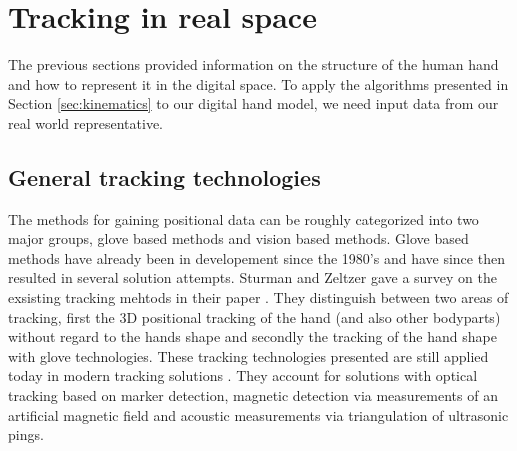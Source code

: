 \chapter{Tracking in real space}
The previous sections provided information on the structure of the human hand and how to represent it in the digital space. To apply the algorithms presented in Section \ref{sec:kinematics} to our digital hand model, we need input data from our real world representative.
\section{General tracking technologies}
\label{General tracking technologies}
The methods for gaining positional data can be roughly categorized into two major groups, glove based methods and vision based methods. Glove based methods have already been in developement since the 1980's \cite{Bolt.1980} and have since then resulted in several solution attempts. Sturman and Zeltzer gave a survey on the exsisting tracking mehtods in their paper \cite{Sturman.1994}. They distinguish between two areas of tracking, first the 3D positional tracking of the hand (and also other bodyparts) without regard to the hands shape and secondly the tracking of the hand shape with glove technologies. These tracking technologies presented are still applied today in modern tracking solutions \cite{Welch.2002,Rolland.2001}. They account for solutions with optical tracking based on marker detection, magnetic detection via measurements of an artificial magnetic field \cite{Raab.1979} and acoustic measurements via triangulation of ultrasonic pings.

